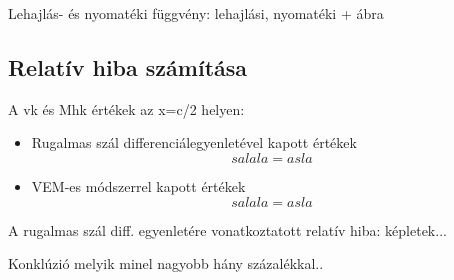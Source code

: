 \documentclass{article}
\begin{document}
		Lehajlás- és nyomatéki függvény:
		lehajlási, nyomatéki + ábra
	\subsection{Relatív hiba számítása}	
		A vk és Mhk értékek az x=c/2 helyen:
		\begin{itemize}
			\item Rugalmas szál differenciálegyenletével kapott értékek
			\begin{equation}
				salala = asla
			\end{equation}
			\item VEM-es módszerrel kapott értékek
			\begin{equation}
			salala = asla
			\end{equation}
		\end{itemize}
		
		A rugalmas szál diff. egyenletére vonatkoztatott relatív hiba:
		képletek...
		
		Konklúzió melyik minel nagyobb hány százalékkal..
		
		
		
	
	
\end{document}
